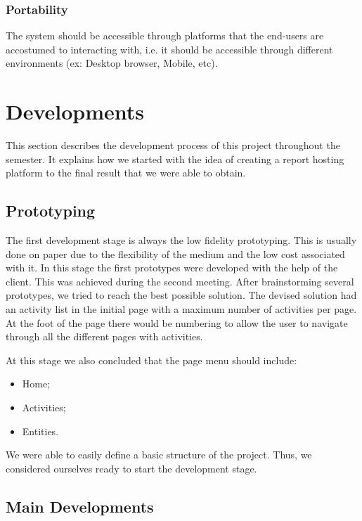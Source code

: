 \documentclass[a4paper,12pt,journal,twoside,compsoc]{PPIEEEtran}
\begin{document}
\subsubsection{Portability}

The system should be accessible through platforms that the end-users are accostumed to interacting with, i.e. it should be accessible through different environments (ex: Desktop browser, Mobile, etc).


\section{Developments}

This section describes the development process of this project throughout the semester. It explains how we started with the idea of creating a report hosting platform to the final result that we were able to obtain.

\subsection{Prototyping}

The first development stage is always the low fidelity prototyping. This is usually done on paper due to the flexibility of the medium and the low cost associated with it. In this stage the first prototypes were developed with the help of the client. This was achieved during the second meeting.
After brainstorming several prototypes, we tried to reach the best possible solution. The devised solution had an activity list in the initial page with a maximum number of activities per page. At the foot of the page there would be numbering to allow the user to navigate through all the different pages with activities.

At this stage we also concluded that the page menu should include:
\begin{itemize}
	\item Home;
	\item Activities;
	\item Entities.
\end{itemize}

We were able to easily define a basic structure of the project. Thus, we considered ourselves ready to start the development stage.

\subsection{Main Developments}
\end{document}
